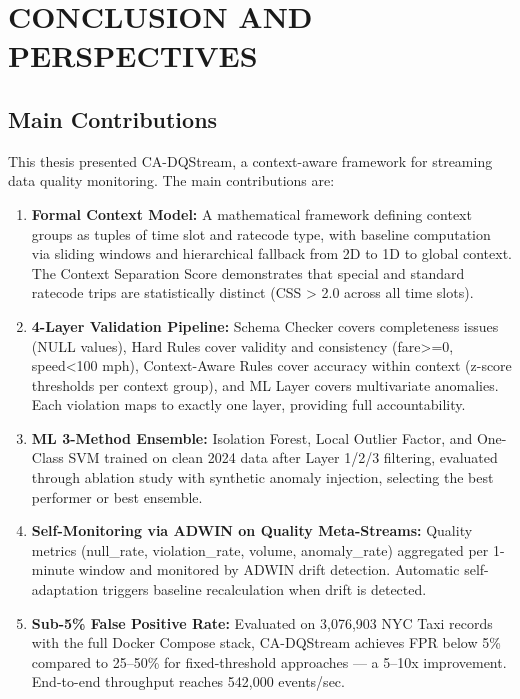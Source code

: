 \documentclass[a4paper, reqno, oneside]{book}
\begin{document}








\chapter{CONCLUSION AND PERSPECTIVES}

\section{Main Contributions}

This thesis presented CA-DQStream, a context-aware framework for streaming data quality monitoring. The main contributions are:

\begin{enumerate}
    \item \textbf{Formal Context Model:} A mathematical framework defining context groups as tuples of time slot and ratecode type, with baseline computation via sliding windows and hierarchical fallback from 2D to 1D to global context. The Context Separation Score demonstrates that special and standard ratecode trips are statistically distinct (CSS > 2.0 across all time slots).

    \item \textbf{4-Layer Validation Pipeline:} Schema Checker covers completeness issues (NULL values), Hard Rules cover validity and consistency (fare>=0, speed<100 mph), Context-Aware Rules cover accuracy within context (z-score thresholds per context group), and ML Layer covers multivariate anomalies. Each violation maps to exactly one layer, providing full accountability.

    \item \textbf{ML 3-Method Ensemble:} Isolation Forest, Local Outlier Factor, and One-Class SVM trained on clean 2024 data after Layer 1/2/3 filtering, evaluated through ablation study with synthetic anomaly injection, selecting the best performer or best ensemble.

    \item \textbf{Self-Monitoring via ADWIN on Quality Meta-Streams:} Quality metrics (null\_rate, violation\_rate, volume, anomaly\_rate) aggregated per 1-minute window and monitored by ADWIN drift detection. Automatic self-adaptation triggers baseline recalculation when drift is detected.

    \item \textbf{Sub-5\% False Positive Rate:} Evaluated on 3,076,903 NYC Taxi records with the full Docker Compose stack, CA-DQStream achieves FPR below 5\% compared to 25--50\% for fixed-threshold approaches --- a 5--10x improvement. End-to-end throughput reaches 542,000 events/sec.
\end{enumerate}
\end{document}
